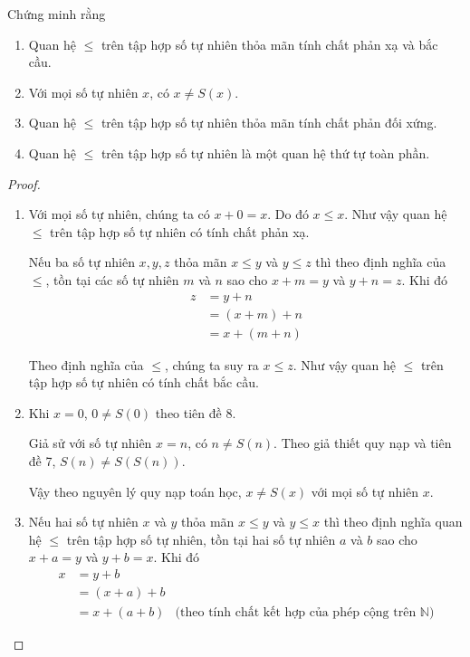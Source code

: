 \begin{proposition}
	Chứng minh rằng
	\begin{enumerate}[label={(\roman*)}]
		\item Quan hệ $\leq$ trên tập hợp số tự nhiên thỏa mãn tính chất phản xạ và bắc cầu.
		\item Với mọi số tự nhiên $x$, có $x\ne S(x)$.
		\item Quan hệ $\leq$ trên tập hợp số tự nhiên thỏa mãn tính chất phản đối xứng.
		\item Quan hệ $\leq$ trên tập hợp số tự nhiên là một quan hệ thứ tự toàn phần.
	\end{enumerate}
\end{proposition}

\begin{proof}
	\begin{enumerate}[label={(\roman*)}]
		\item Với mọi số tự nhiên, chúng ta có $x + 0 = x$. Do đó $x\leq x$. Như vậy quan hệ $\leq$ trên tập hợp số tự nhiên có tính chất phản xạ.

		      Nếu ba số tự nhiên $x, y, z$ thỏa mãn $x\leq y$ và $y\leq z$ thì theo định nghĩa của $\leq$, tồn tại các số tự nhiên $m$ và $n$ sao cho $x + m = y$ và $y + n = z$. Khi đó
		      \begin{align*}
			      z & = y + n       \\
			        & = (x + m) + n \\
			        & = x + (m + n)
		      \end{align*}

		      Theo định nghĩa của $\leq$, chúng ta suy ra $x\leq z$. Như vậy quan hệ $\leq$ trên tập hợp số tự nhiên có tính chất bắc cầu.
		\item Khi $x = 0$, $0\ne S(0)$ theo tiên đề 8.

		      Giả sử với số tự nhiên $x = n$, có $n\ne S(n)$. Theo giả thiết quy nạp và tiên đề 7, $S(n)\ne S(S(n))$.

		      Vậy theo nguyên lý quy nạp toán học, $x\ne S(x)$ với mọi số tự nhiên $x$.
		\item Nếu hai số tự nhiên $x$ và $y$ thỏa mãn $x\leq y$ và $y\leq x$ thì theo định nghĩa quan hệ $\leq$ trên tập hợp số tự nhiên, tồn tại hai số tự nhiên $a$ và $b$ sao cho $x + a = y$ và $y + b = x$. Khi đó
		      \begin{align*}
			      x & = y + b                                                                         \\
			        & = (x + a) + b                                                                   \\
			        & = x + (a + b) & \text{(theo tính chất kết hợp của phép cộng trên $\mathbb{N}$)}
		      \end{align*}


\end{enumerate}
\end{proof}
